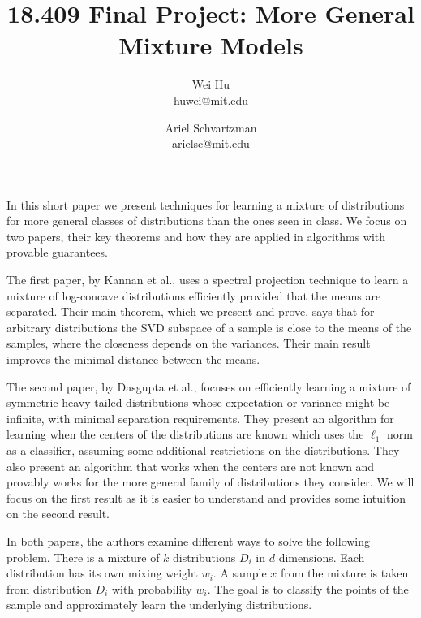 \documentclass[11pt,letter]{article}
\begin{document}


\title{18.409 Final Project: More General Mixture Models}

\author{Wei Hu\\ \href{mailto:huwei@mit.edu}{huwei@mit.edu} \and Ariel Schvartzman \\ \href{mailto:arielsc@mit.edu}{arielsc@mit.edu}} 
 
\maketitle 

In this short paper we present techniques for learning a mixture of distributions for more general classes of distributions than the ones seen in class. We focus on two papers, their key theorems and how they are applied in algorithms with provable guarantees. 

The first paper, by Kannan et al.\cite{doi:10.1137/S0097539704445925}, uses a spectral projection technique to learn a mixture of log-concave distributions efficiently provided that the means are separated. Their main theorem, which we present and prove, says that for arbitrary distributions the SVD subspace of a sample is close to the means of the samples, where the closeness depends on the variances. Their main result improves the minimal distance between the means. 

The second paper, by Dasgupta et al.\cite{1530741}, focuses on efficiently learning a mixture of symmetric heavy-tailed distributions whose expectation or variance might be infinite, with minimal separation requirements. They present an algorithm for learning when the centers of the distributions are known which uses the $\ell_1$ norm as a classifier, assuming some additional restrictions on the distributions. They also present an algorithm that works when the centers are not known and provably works for the more general family of distributions they consider. We will focus on the first result as it is easier to understand and provides some intuition on the second result. 

In both papers, the authors examine different ways to solve the following problem. There is a mixture of $k$ distributions $D_i$ in $d$ dimensions. Each distribution has its own mixing weight $w_i$. A sample $x$ from the mixture is taken from distribution $D_i$ with probability $w_i$. The goal is to classify the points of the sample and approximately learn the underlying distributions. 
\end{document}
